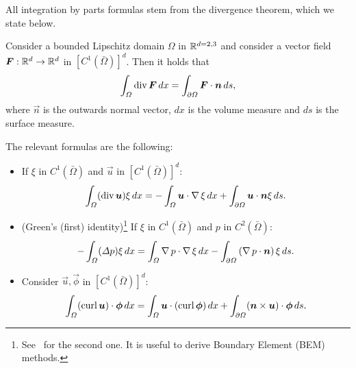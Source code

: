 All integration by parts formulas stem from the divergence theorem, which we state below.
\begin{theorem}\label{thm:divergence}
    Consider a bounded Lipschitz domain $\Omega$ in $\mathbb{R}^{d=2,3}$ and consider a vector field $\vec F:\R^d \to \R^d$ in $[C^1(\bar\Omega)]^d$. Then it holds that
    \begin{equation*}
        \int_\Omega \dive \vec F\,dx = \int_{\partial\Omega}\vec F\cdot \vec n\,ds,
    \end{equation*}
    where $\vec n$ is the outwards normal vector, $dx$ is the volume measure and $ds$ is the surface measure.
\end{theorem}
The relevant formulas are the following: 
\begin{itemize}
    \item If $\xi$ in $C^1(\bar\Omega)$ and $\vec u$ in $[C^1(\bar\Omega)]^d$:
    \begin{equation}
        \int_\Omega (\dive \vec u) \xi\,dx = -\int_\Omega\vec u\cdot \grad \xi\,dx + \int_{\partial\Omega} \vec u \cdot \vec n \xi\,ds.
    \end{equation}
    \item (Green's (first) identity)\footnote{See~\cite{monk2003finite} for the second one. It is useful to derive Boundary Element (BEM) methods.} If $\xi$ in $C^1(\bar\Omega)$ and $p$ in $C^2(\bar\Omega)$:
    \begin{equation}
        -\int_\Omega (\Delta p) \xi\,dx = \int_\Omega\grad p\cdot \grad \xi\,dx - \int_{\partial\Omega}\left(\grad p\cdot \vec n\right)\xi\,ds.
    \end{equation}
    \item Consider $\vec u,\vec \phi$ in $[C^1(\bar\Omega)]^d$: 
    \begin{equation}
        \int_\Omega (\curl \vec u) \cdot \vec\phi\,dx = \int_\Omega \vec u \cdot (\curl \vec \phi)\,dx  + \int_{\partial\Omega}(\vec n\times \vec u)\cdot \vec\phi\,ds.
    \end{equation}
\end{itemize}

